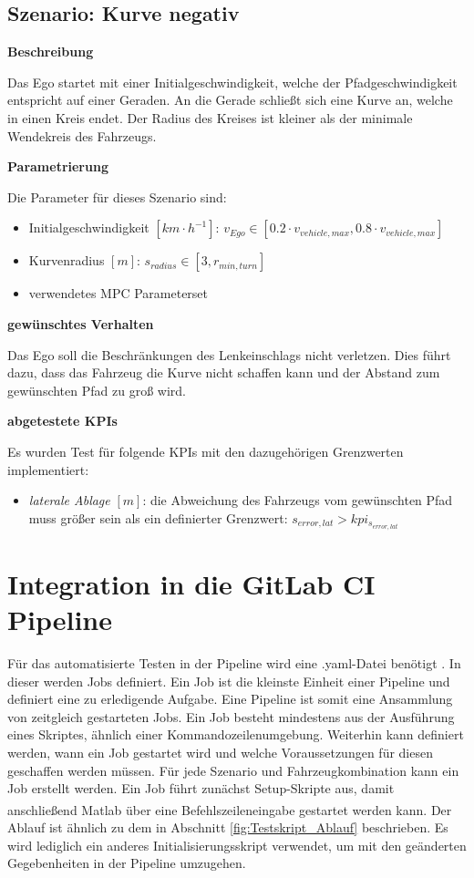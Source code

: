 \subsection{Szenario: Kurve negativ} \label{subsec:kurveNegativ}
\textbf{Beschreibung}

\noindent Das Ego startet mit einer Initialgeschwindigkeit, welche der Pfadgeschwindigkeit entspricht auf einer Geraden. An die Gerade schließt sich eine Kurve an, welche in einen Kreis endet. Der Radius des Kreises ist kleiner als der minimale Wendekreis des Fahrzeugs. 

\bigskip\noindent\textbf{Parametrierung}

\noindent Die Parameter für dieses Szenario sind:
\begin{itemize}
    \item Initialgeschwindigkeit $[km\cdot h^{-1}]$: $v_{Ego} \in [0.2\cdot v_{vehicle,max}, 0.8\cdot v_{vehicle,max}]$
    \item Kurvenradius $[m]$: $s_{radius} \in [3,r_{min,turn}]$
    \item verwendetes MPC Parameterset
\end{itemize}

\bigskip\noindent\textbf{gewünschtes Verhalten}

\noindent Das Ego soll die Beschränkungen des Lenkeinschlags nicht verletzen. Dies führt dazu, dass das Fahrzeug die Kurve nicht schaffen kann und der Abstand zum gewünschten Pfad zu groß wird.

\bigskip\noindent\textbf{abgetestete KPIs}

\noindent Es wurden Test für folgende KPIs mit den dazugehörigen Grenzwerten implementiert:
\begin{itemize}
    \item \textit{laterale Ablage} $[m]$: die Abweichung des Fahrzeugs vom gewünschten Pfad muss größer sein als ein definierter Grenzwert: $s_{error,lat} > kpi_{s_{error,lat}}$
\end{itemize}



\section{Integration in die GitLab CI Pipeline} \label{sec:CIPipeline}
Für das automatisierte Testen in der Pipeline wird eine .yaml-Datei benötigt \cite{GitLabDoks}. In dieser werden Jobs definiert. Ein Job ist die kleinste Einheit einer Pipeline und definiert eine zu erledigende Aufgabe. Eine Pipeline ist somit eine Ansammlung von zeitgleich gestarteten Jobs. Ein Job besteht mindestens aus der Ausführung eines Skriptes, ähnlich einer Kommandozeilenumgebung. Weiterhin kann definiert werden, wann ein Job gestartet wird und welche Voraussetzungen für diesen geschaffen werden müssen.
Für jede Szenario und Fahrzeugkombination kann ein Job erstellt werden. Ein Job führt zunächst Setup-Skripte aus, damit anschließend Matlab\textsuperscript{\textregistered} über eine Befehlszeileneingabe gestartet werden kann. Der Ablauf ist ähnlich zu dem in Abschnitt \ref{fig:Testskript_Ablauf} beschrieben. Es wird lediglich ein anderes Initialisierungsskript verwendet, um mit den geänderten Gegebenheiten in der Pipeline umzugehen.

